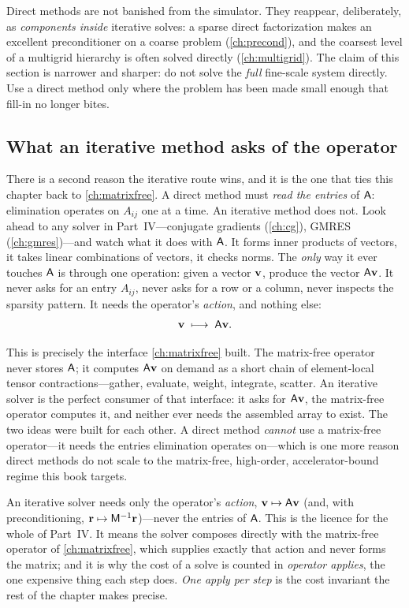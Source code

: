 \begin{notationbox}
Direct methods are not banished from the simulator. They reappear, deliberately,
as \emph{components inside} iterative solves: a sparse direct factorization makes an
excellent preconditioner on a coarse problem (\cref{ch:precond}), and the coarsest
level of a multigrid hierarchy is often solved directly (\cref{ch:multigrid}). The
claim of this section is narrower and sharper: do not solve the \emph{full}
fine-scale system directly. Use a direct method only where the problem has been
made small enough that fill-in no longer bites.
\end{notationbox}

\subsection{What an iterative method asks of the operator}
\label{sec:krylov-action}

There is a second reason the iterative route wins, and it is the one that ties this
chapter back to \cref{ch:matrixfree}. A direct method must \emph{read the entries}
of $\mathsf{A}$: elimination operates on $A_{ij}$ one at a time. An iterative method
does not. Look ahead to any solver in Part~IV---conjugate gradients
(\cref{ch:cg}), GMRES (\cref{ch:gmres})---and watch what it does with $\mathsf{A}$. It
forms inner products of vectors, it takes linear combinations of vectors, it
checks norms. The \emph{only} way it ever touches $\mathsf{A}$ is through one
operation: given a vector $\mathbf{v}$, produce the vector $\mathsf{A}\mathbf{v}$. It never asks for
an entry $A_{ij}$, never asks for a row or a column, never inspects the sparsity
pattern. It needs the operator's \emph{action}, and nothing else:
\[
  \mathbf{v} \;\longmapsto\; \mathsf{A}\mathbf{v} .
\]

This is precisely the interface \cref{ch:matrixfree} built. The matrix-free
operator never stores $\mathsf{A}$; it computes $\mathsf{A}\mathbf{v}$ on demand as a short
chain of element-local tensor contractions---gather, evaluate, weight, integrate,
scatter. An iterative solver is the perfect consumer of that interface: it asks for
$\mathsf{A}\mathbf{v}$, the matrix-free operator computes it, and neither ever needs the
assembled array to exist. The two ideas were built for each other. A direct method
\emph{cannot} use a matrix-free operator---it needs the entries elimination
operates on---which is one more reason direct methods do not scale to the
matrix-free, high-order, accelerator-bound regime this book targets.

\begin{keyidea}
An iterative solver needs only the operator's \emph{action}, $\mathbf{v}\mapsto\mathsf{A}\mathbf{v}$
(and, with preconditioning, $\mathbf{r}\mapsto\mathsf{M}^{-1}\mathbf{r}$)---never the entries of
$\mathsf{A}$. This is the licence for the whole of Part~IV. It means the solver
composes directly with the matrix-free operator of \cref{ch:matrixfree}, which
supplies exactly that action and never forms the matrix; and it is why the cost of
a solve is counted in \emph{operator applies}, the one expensive thing each step
does. \emph{One apply per step} is the cost invariant the rest of the chapter makes
precise.
\end{keyidea}

